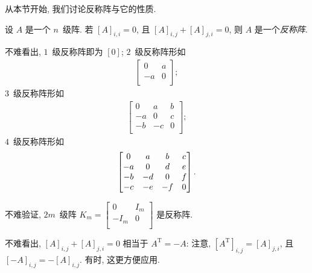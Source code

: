 \documentclass[../libro.tex]{subfiles}
\begin{document}
从本节开始, 我们讨论反称阵与它的性质.

\begin{definition}
    设 \(A\) 是一个 \(n\)~级阵.
    若 \([A]_{i,i} = 0\),
    且
    \([A]_{i,j} + [A]_{j,i} = 0\),
    则 \(A\) 是一个\emph{反称阵}.
\end{definition}

\begin{example}
    不难看出,
    \(1\)~级反称阵即为 \([0]\);
    \(2\)~级反称阵形如
    \begin{align*}
        \begin{bmatrix}
            0  & a \\
            -a & 0 \\
        \end{bmatrix};
    \end{align*}
    \(3\)~级反称阵形如
    \begin{align*}
        \begin{bmatrix}
            0  & a  & b \\
            -a & 0  & c \\
            -b & -c & 0 \\
        \end{bmatrix};
    \end{align*}
    \(4\)~级反称阵形如
    \begin{equation*}
        \begin{bmatrix}
            0  & a  & b  & c \\
            -a & 0  & d  & e \\
            -b & -d & 0  & f \\
            -c & -e & -f & 0 \\
        \end{bmatrix}.
        \qedhere
    \end{equation*}
\end{example}

\begin{example}
    不难验证, \(2m\)~级阵
    \(
        K_m =
        \begin{bmatrix}
            0    & I_m \\
            -I_m & 0   \\
        \end{bmatrix}
    \)
    是反称阵.
\end{example}

不难看出,
\([A]_{i,j} + [A]_{j,i} = 0\)
相当于 \(A^{\mathrm{T}} = -A\):
注意, \([A^{\mathrm{T}}]_{i,j} = [A]_{j,i}\),
且 \([-A]_{i,j} = -[A]_{i,j}\).
有时, 这更方便应用.
\end{document}

